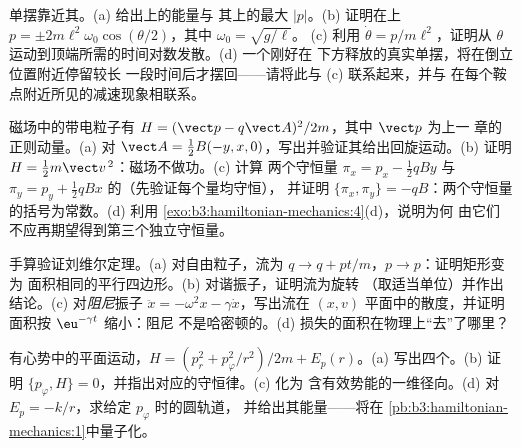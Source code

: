 \begin{exercise}[$\star\star$]\label{exo:b3:hamiltonian-mechanics:5}
单摆靠近其。(a) 给出上的能量与
其上的最大 $|p|$。(b) 证明在上 $p =
\pm 2m\ell^2\omega_0\cos(\theta/2)$，其中 $\omega_0 = \sqrt{g/\ell}$。
(c) 利用 $\dot\theta = p/m\ell^2$，证明从 $\theta$
运动到顶端所需的时间对数发散。(d) 一个刚好在
下方释放的真实单摆，将在倒立位置附近停留较长
一段时间后才摆回——请将此与 (c) 联系起来，并与
在每个鞍点附近所见的减速现象相联系。
\end{exercise}

\begin{exercise}[$\star\star$]\label{exo:b3:hamiltonian-mechanics:6}
磁场中的带电粒子有 $H = (\vect p -
q\vect A)^2/2m$，其中 $\vect p$ 为上一
章的正则动量。(a) 对 $\vect A = \tfrac12
B(-y, x, 0)$，写出并验证其给出回旋运动。(b) 证明 $H =
\tfrac12 m\vect v^{\,2}$：磁场不做功。(c) 计算
两个守恒量 $\pi_x = p_x - \tfrac12
qBy$ 与 $\pi_y = p_y + \tfrac12 qBx$ 的（先验证每个量均守恒），
并证明 $\{\pi_x, \pi_y\} = -qB$：两个守恒量
的括号为常数。(d) 利用
\cref{exo:b3:hamiltonian-mechanics:4}(d)，说明为何
由它们不应再期望得到第三个独立守恒量。
\end{exercise}

\begin{exercise}[$\star\star$]\label{exo:b3:hamiltonian-mechanics:7}
手算验证刘维尔定理。(a) 对自由粒子，流为 $q \to q +
pt/m$，$p \to p$：证明矩形变为
面积相同的平行四边形。(b) 对谐振子，证明流为旋转
（取适当单位）并作出结论。(c) 对\emph{阻尼}振子
$\ddot x = -\omega^2x - \gamma\dot x$，写出流在
$(x, v)$ 平面中的散度，并证明面积按 $\eu^{-\gamma t}$ 缩小：阻尼
不是哈密顿的。(d) 损失的面积在物理上“去”了哪里？
\end{exercise}

\begin{exercise}[$\star\star$]\label{exo:b3:hamiltonian-mechanics:8}
有心势中的平面运动，$H = (p_r^2 + p_\varphi^2/r^2)/2m
+ E_p(r)$。(a) 写出四个。(b) 证明 $\{
p_\varphi, H\} = 0$，并指出对应的守恒律。(c) 化为
含有效势能的一维径向。(d)
对 $E_p = -k/r$，求给定 $p_\varphi$ 时的圆轨道，
并给出其能量——将在
\cref{pb:b3:hamiltonian-mechanics:1}中量子化。
\end{exercise}

